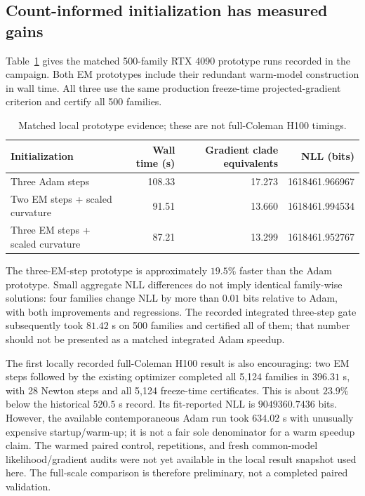 \documentclass[11pt]{article}
\begin{document}
\subsection{Count-informed initialization has measured gains}

Table~\ref{tab:local-results} gives the matched 500-family RTX 4090 prototype
runs recorded in the campaign. Both EM prototypes include their redundant
warm-model construction in wall time. All three use the same production
freeze-time projected-gradient criterion and certify all 500 families.

\begin{table}[htbp]
 \centering
 \small
 \begin{tabular}{lrrr}
  \toprule
  Initialization & Wall time (s) & Gradient clade equivalents & NLL (bits)\\
  \midrule
  Three Adam steps & 108.33 & 17.273 & 1618461.966967\\
  Two EM steps + scaled curvature & 91.51 & 13.660 & 1618461.994534\\
  Three EM steps + scaled curvature & 87.21 & 13.299 & 1618461.952767\\
  \bottomrule
 \end{tabular}
 \caption{Matched local prototype evidence; these are not full-Coleman H100 timings.}
 \label{tab:local-results}
\end{table}

The three-EM-step prototype is approximately $19.5\%$ faster than the Adam
prototype. Small aggregate NLL differences do not imply identical family-wise
solutions: four families change NLL by more than $0.01$ bits relative to Adam,
with both improvements and regressions. The recorded integrated three-step
gate subsequently took $81.42$ s on 500 families and certified all of them;
that number should not be presented as a matched integrated Adam speedup.

The first locally recorded full-Coleman H100 result is also encouraging:
two EM steps followed by the existing optimizer completed all 5,124 families
in $396.31$ s, with 28 Newton steps and all 5,124 freeze-time certificates.
This is about $23.9\%$ below the historical $520.5$ s record. Its fit-reported
NLL is $9049360.7436$ bits. However, the available contemporaneous Adam run
took $634.02$ s with unusually expensive startup/warm-up; it is not a fair sole
denominator for a warm speedup claim. The warmed paired control, repetitions,
and fresh common-model likelihood/gradient audits were not yet available in
the local result snapshot used here. The full-scale comparison is therefore
preliminary, not a completed paired validation.
\end{document}
